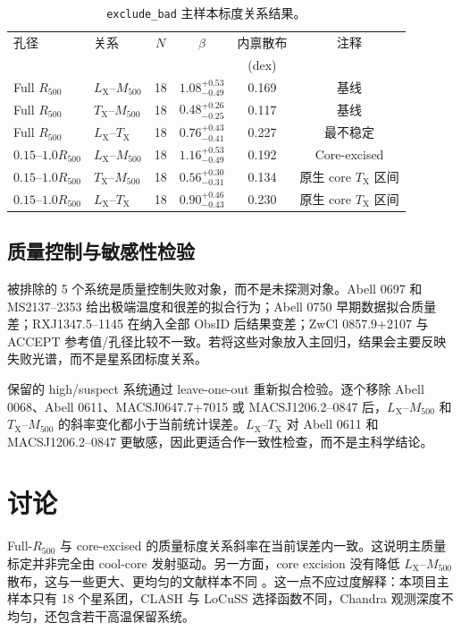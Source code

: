 \documentclass[UTF8,11pt,fontset=none]{ctexart}
\newcommand{\Mfive}{\ensuremath{M_{500}}}
\newcommand{\Rfive}{\ensuremath{R_{500}}}
\newcommand{\Lx}{\ensuremath{L_{\mathrm{X}}}}
\newcommand{\Tx}{\ensuremath{T_{\mathrm{X}}}}
\begin{document}
\begin{table}[t]
\centering
\caption{\texttt{exclude\_bad} 主样本标度关系结果。}
\label{tab:scaling}
\begin{tabular}{llcccc}
\toprule
孔径 & 关系 & $N$ & $\beta$ & 内禀散布 & 注释 \\
 & & & & (dex) & \\
\midrule
Full \Rfive{} & \Lx--\Mfive{} & 18 & $1.08^{+0.53}_{-0.49}$ & 0.169 & 基线 \\
Full \Rfive{} & \Tx--\Mfive{} & 18 & $0.48^{+0.26}_{-0.25}$ & 0.117 & 基线 \\
Full \Rfive{} & \Lx--\Tx{} & 18 & $0.76^{+0.43}_{-0.41}$ & 0.227 & 最不稳定 \\
$0.15$--$1.0\Rfive$ & \Lx--\Mfive{} & 18 & $1.16^{+0.53}_{-0.49}$ & 0.192 & Core-excised \\
$0.15$--$1.0\Rfive$ & \Tx--\Mfive{} & 18 & $0.56^{+0.30}_{-0.31}$ & 0.134 & 原生 core \Tx{} 区间 \\
$0.15$--$1.0\Rfive$ & \Lx--\Tx{} & 18 & $0.90^{+0.46}_{-0.43}$ & 0.230 & 原生 core \Tx{} 区间 \\
\bottomrule
\end{tabular}
\end{table}

\subsection{质量控制与敏感性检验}

被排除的 5 个系统是质量控制失败对象，而不是未探测对象。Abell 0697 和 MS2137--2353 给出极端温度和很差的拟合行为；Abell 0750 早期数据拟合质量差；RXJ1347.5--1145 在纳入全部 ObsID 后结果变差；ZwCl 0857.9+2107 与 ACCEPT 参考值/孔径比较不一致。若将这些对象放入主回归，结果会主要反映失败光谱，而不是星系团标度关系。

保留的 high/suspect 系统通过 leave-one-out 重新拟合检验。逐个移除 Abell 0068、Abell 0611、MACSJ0647.7+7015 或 MACSJ1206.2--0847 后，\Lx--\Mfive{} 和 \Tx--\Mfive{} 的斜率变化都小于当前统计误差。\Lx--\Tx{} 对 Abell 0611 和 MACSJ1206.2--0847 更敏感，因此更适合作一致性检查，而不是主科学结论。

\section{讨论}

Full-\Rfive{} 与 core-excised 的质量标度关系斜率在当前误差内一致。这说明主质量标定并非完全由 cool-core 发射驱动。另一方面，core excision 没有降低 \Lx--\Mfive{} 散布，这与一些更大、更均匀的文献样本不同 \citep{pratt2009,mantz2010,mantz2016}。这一点不应过度解释：本项目主样本只有 18 个星系团，CLASH 与 LoCuSS 选择函数不同，Chandra 观测深度不均匀，还包含若干高温保留系统。
\end{document}
